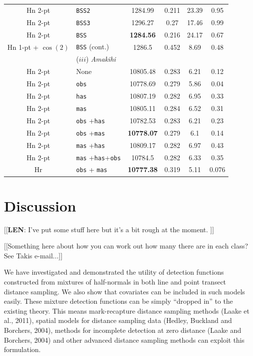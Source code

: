 \documentclass[useAMS,referee]{biom}
\begin{document}
\begin{table}
\begin{tabular}{c l c c c c}
Hn 2-pt  &  \texttt{BSS2}  &  1284.99  &  0.211  &  23.39  &  0.95 \\
Hn 2-pt  &  \texttt{BSS3}  &  1296.27  &  0.27  &  17.46  &  0.99 \\
Hn 2-pt  &  \texttt{BSS}  &  \textbf{1284.56}  &  0.216  &  24.17  &  0.67 \\
Hn 1-pt + $\cos(2)$& \texttt{BSS} (cont.) & 1286.5 & 0.452 & 8.69 & 0.48\\ %
 & ($iii$) \textit{Amakihi} & & & & \\
Hn 2-pt  &  None  &  10805.48  &  0.283  &  6.21  &  0.12 \\
Hn 2-pt  & \texttt{obs} &  10778.69  &  0.279  &  5.86  &  0.04 \\
Hn 2-pt  &  \texttt{has}  &  10807.19  &  0.282  &  6.95  &  0.33 \\
Hn 2-pt  &  \texttt{mas}  &  10805.11  &  0.284  &  6.52  &  0.31 \\
Hn 2-pt  &  \texttt{obs} +\texttt{has}  &  10782.53  &  0.283  &  6.21  &  0.23 \\
Hn 2-pt  &  \texttt{obs} +\texttt{mas}  &  \textbf{10778.07}  &  0.279  &  6.1  &  0.14 \\
Hn 2-pt  &  \texttt{mas} +\texttt{has}  &  10809.17  &  0.282  &  6.97  &  0.43 \\
Hn 2-pt  &  \texttt{mas} +\texttt{has}+\texttt{obs}  &  10784.5  &  0.282  &  6.33  &  0.35 \\
Hr & \texttt{obs} + \texttt{mas} & \textbf{10777.38} &  0.319 & 5.11 & 0.076\\ %
\hline
\hline
\end{tabular}
\label{big-results-table}
\end{table}

\section{Discussion}
\label{s:discuss}

[[\textbf{LEN}: I've put some stuff here but it's a bit rough at the moment. ]]

[[Something here about how you can work out how many there are in each class? See Takis e-mail...]]


We have investigated and demonstrated the utility of detection functions constructed from mixtures of half-normals in both line and point transect distance sampling. We also show that covariates can be included in such models easily. These mixture detection functions can be simply ``dropped in'' to the existing theory. This means mark-recapture distance sampling methods (Laake et al., 2011), spatial models for distance sampling data (Hedley, Buckland and Borchers, 2004), methods for incomplete detection at zero distance (Laake and Borchers, 2004) and other advanced distance sampling methods can exploit this formulation.
\end{document}
